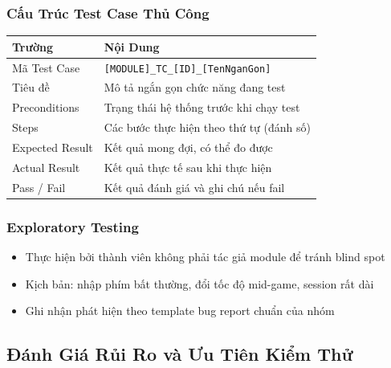 \documentclass[12pt,a4paper]{article}
\begin{document}
\subsubsection{Cấu Trúc Test Case Thủ Công}


\begin{table}[H]
\centering
{}
\begin{tabularx}{\linewidth}{|l|X|}
\hline
\rowcolor{gray!35}
\textbf{Trường} & \textbf{Nội Dung} \\ \hline
Mã Test Case    & \texttt{[MODULE]\_TC\_[ID]\_[TenNganGon]} \\ \hline
Tiêu đề         & Mô tả ngắn gọn chức năng đang test \\ \hline
Preconditions   & Trạng thái hệ thống trước khi chạy test \\ \hline
Steps           & Các bước thực hiện theo thứ tự (đánh số) \\ \hline
Expected Result & Kết quả mong đợi, có thể đo được \\ \hline
Actual Result   & Kết quả thực tế sau khi thực hiện \\ \hline
Pass / Fail     & Kết quả đánh giá và ghi chú nếu fail \\ \hline
\end{tabularx}
\end{table}

\subsubsection{Exploratory Testing}
\begin{itemize}[leftmargin=3em]
  \item Thực hiện bởi thành viên không phải tác giả module để tránh blind spot
  \item Kịch bản: nhập phím bất thường, đổi tốc độ mid-game, session rất dài
  \item Ghi nhận phát hiện theo template bug report chuẩn của nhóm
\end{itemize}

\subsection{Đánh Giá Rủi Ro và Ưu Tiên Kiểm Thử}
\end{document}
